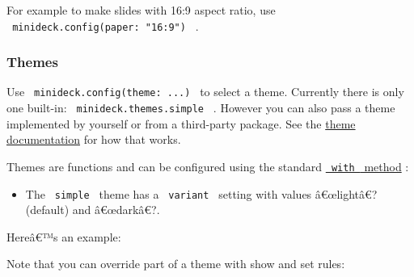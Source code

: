 For example to make slides with 16:9 aspect ratio, use
\texttt{\ minideck.config(paper:\ "16:9")\ } .

\subsubsection{Themes}\label{themes}

Use \texttt{\ minideck.config(theme:\ ...)\ } to select a theme.
Currently there is only one built-in:
\texttt{\ minideck.themes.simple\ } . However you can also pass a theme
implemented by yourself or from a third-party package. See the
\href{https://github.com/typst/packages/raw/main/packages/preview/minideck/0.2.1/themes/README.md}{theme
documentation} for how that works.

Themes are functions and can be configured using the standard
\href{https://typst.app/docs/reference/foundations/function/\#definitions-with}{\texttt{\ with\ }
method} :

\begin{itemize}
\tightlist
\item
  The \texttt{\ simple\ } theme has a \texttt{\ variant\ } setting with
  values â€œlightâ€? (default) and â€œdarkâ€?.
\end{itemize}

Hereâ€™s an example:

\begin{Shaded}
\begin{Highlighting}[]

\NormalTok{)}

\NormalTok{\#slide[}
  
\NormalTok{]}
\end{Highlighting}
\end{Shaded}

Note that you can override part of a theme with show and set rules:

\begin{Shaded}
\begin{Highlighting}[]

\NormalTok{)}


\NormalTok{\#slide[}
  
\NormalTok{]}
\end{Highlighting}
\end{Shaded}

